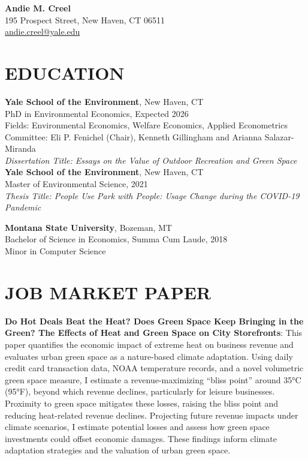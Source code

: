 \documentclass[11pt]{article}
\begin{document}
\raggedbottom %

\begin{center}
    \textbf{\Huge Andie M. Creel} \\
    195 Prospect Street, New Haven, CT 06511 \\
    \href{mailto:andie.creel@yale.edu}{andie.creel@yale.edu}
\end{center}

\section*{EDUCATION}
\textbf{Yale School of the Environment}, New Haven, CT \\
PhD in Environmental Economics, Expected 2026 \\
Fields: Environmental Economics, Welfare Economics, Applied Econometrics\\
Committee: Eli P. Fenichel (Chair), Kenneth Gillingham and Arianna Salazar-Miranda \\
\textit{Dissertation Title: Essays on the Value of Outdoor Recreation and Green Space}\\


\textbf{Yale School of the Environment}, New Haven, CT \\
Master of Environmental Science, 2021 \\
\textit{Thesis Title: People Use Park with People: Usage Change during the COVID-19 Pandemic}

\textbf{Montana State University}, Bozeman, MT \\
Bachelor of Science in Economics, Summa Cum Laude, 2018 \\
Minor in Computer Science

\section*{JOB MARKET PAPER}
\textbf{Do Hot Deals Beat the Heat? Does Green Space Keep Bringing in the Green? The Effects of Heat and Green Space on City Storefronts}: This paper quantifies the economic impact of extreme heat on business revenue and evaluates urban green space as a nature-based climate adaptation. Using daily credit card transaction data, NOAA temperature records, and a novel volumetric green space measure, I estimate a revenue-maximizing “bliss point” around 35°C (95°F), beyond which revenue declines, particularly for leisure businesses. Proximity to green space mitigates these losses, raising the bliss point and reducing heat-related revenue declines. Projecting future revenue impacts under climate scenarios, I estimate potential losses and assess how green space investments could offset economic damages. These findings inform climate adaptation strategies and the valuation of urban green space.
\end{document}
